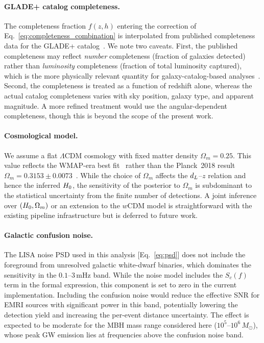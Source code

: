 \paragraph{GLADE+ catalog completeness.}
The completeness fraction $f(z, h)$ entering the correction of
Eq.~\eqref{eq:completeness_combination} is interpolated from published
completeness data for the GLADE+ catalog~\cite{Dalya:2021ewn}.  We note
two caveats.  First, the published completeness may reflect
\emph{number} completeness (fraction of galaxies detected) rather than
\emph{luminosity} completeness (fraction of total luminosity captured),
which is the more physically relevant quantity for galaxy-catalog-based
analyses~\cite{Gray:2019ksv}.  Second, the completeness is treated as a
function of redshift alone, whereas the actual catalog completeness
varies with sky position, galaxy type, and apparent magnitude.  A more
refined treatment would use the angular-dependent completeness, though
this is beyond the scope of the present work.

\paragraph{Cosmological model.}
We assume a flat $\Lambda$CDM cosmology with fixed matter density
$\Omega_m = 0.25$.  This value reflects the WMAP-era best
fit~\cite{Hinshaw:2012aka} rather than the Planck~2018 result
$\Omega_m = 0.3153 \pm 0.0073$~\cite{Planck:2018vyg}.  While the
choice of $\Omega_m$ affects the $d_L$--$z$ relation and hence the
inferred $H_0$, the sensitivity of the posterior to $\Omega_m$ is
subdominant to the statistical uncertainty from the finite number of
detections.  A joint inference over $(H_0, \Omega_m)$ or an extension
to the $w$CDM model is straightforward with the existing pipeline
infrastructure but is deferred to future work.

\paragraph{Galactic confusion noise.}
The LISA noise PSD used in this analysis
[Eq.~\eqref{eq:psd}] does not include the foreground from unresolved
galactic white-dwarf binaries, which dominates the sensitivity in the
$0.1$--$3\,\mathrm{mHz}$ band.  While the noise model includes the
$S_c(f)$ term in the formal expression, this component is set to zero in
the current implementation.  Including the confusion noise would reduce
the effective SNR for EMRI sources with significant power in this band,
potentially lowering the detection yield and increasing the per-event
distance uncertainty.  The effect is expected to be moderate for the MBH
mass range considered here ($10^5$--$10^6\,M_\odot$), whose peak GW
emission lies at frequencies above the confusion noise band.

